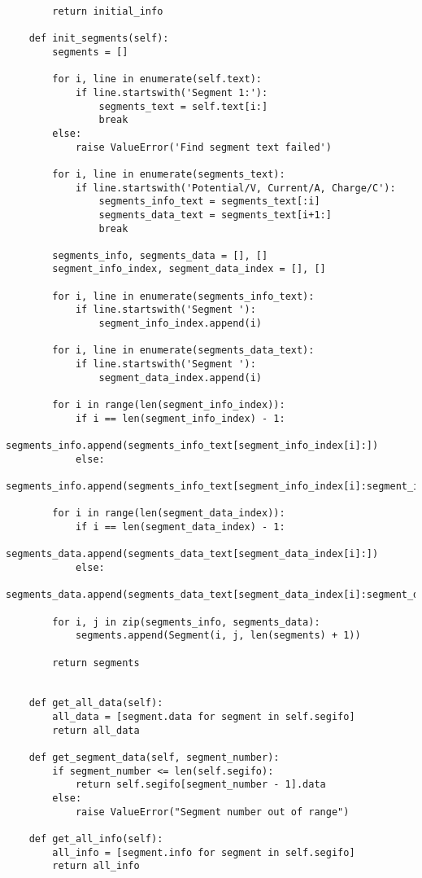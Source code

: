 \begin{verbatim}
        return initial_info

    def init_segments(self):
        segments = []
        
        for i, line in enumerate(self.text):
            if line.startswith('Segment 1:'):
                segments_text = self.text[i:]
                break
        else:
            raise ValueError('Find segment text failed')
        
        for i, line in enumerate(segments_text):
            if line.startswith('Potential/V, Current/A, Charge/C'):
                segments_info_text = segments_text[:i]
                segments_data_text = segments_text[i+1:]
                break
        
        segments_info, segments_data = [], []
        segment_info_index, segment_data_index = [], []

        for i, line in enumerate(segments_info_text):
            if line.startswith('Segment '):
                segment_info_index.append(i)

        for i, line in enumerate(segments_data_text):
            if line.startswith('Segment '):
                segment_data_index.append(i)

        for i in range(len(segment_info_index)):
            if i == len(segment_info_index) - 1:
                segments_info.append(segments_info_text[segment_info_index[i]:])
            else:
                segments_info.append(segments_info_text[segment_info_index[i]:segment_info_index[i+1]])

        for i in range(len(segment_data_index)):
            if i == len(segment_data_index) - 1:
                segments_data.append(segments_data_text[segment_data_index[i]:])
            else:
                segments_data.append(segments_data_text[segment_data_index[i]:segment_data_index[i+1]])

        for i, j in zip(segments_info, segments_data):
            segments.append(Segment(i, j, len(segments) + 1))

        return segments
    
    
    def get_all_data(self):
        all_data = [segment.data for segment in self.segifo]
        return all_data

    def get_segment_data(self, segment_number):
        if segment_number <= len(self.segifo):
            return self.segifo[segment_number - 1].data
        else:
            raise ValueError("Segment number out of range")

    def get_all_info(self):
        all_info = [segment.info for segment in self.segifo]
        return all_info


\end{verbatim}
